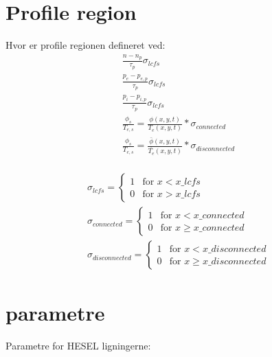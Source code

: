 \documentclass{article}
\begin{document}
\section{Profile region}
Hvor er profile regionen defineret ved:
\begin{gather}
    \frac{n-n_p}{\tau_p}\sigma_{lcfs} \label{profile_n}\\
    \frac{p_e-p_{e,p}}{\tau_p}\sigma_{lcfs} \label{profile_p_e}\\
    \frac{p_i-p_{i,p}}{\tau_p}\sigma_{lcfs} \label{profile_p_i}\\
    \frac{\phi_s}{T_{e,s}} = \frac{\phi(x,y,t)}{T_e(x,y,t)}*\sigma_{connected} \label{phi_s_connected}\\
    \frac{\phi_s}{T_{e,s}} = \frac{\bar\phi(x,y,t)}{\bar{T_e}(x,y,t)}*\sigma_{disconnected} \label{phi_s_disconnected}\\
\end{gather}

\begin{gather}
    \sigma_{lcfs} = \begin{cases}
        1 & \text{for } x < x\_lcfs  \\
        0 & \text{for } x > x\_lcfs
    \end{cases} \label{sigma_lcfs}\\
    \sigma_{connected} = \begin{cases}
        1 & \text{for } x < x\_connected  \\
        0 & \text{for } x \geq x\_connected
    \end{cases} \label{sigma_connected}\\
    \sigma_{disconnected} = \begin{cases}
        1 & \text{for } x < x\_disconnected  \\
        0 & \text{for } x \geq x\_disconnected
    \end{cases} \label{sigma_disconnected}
\end{gather}


\section{parametre}
Parametre for HESEL ligningerne:
\end{document}
